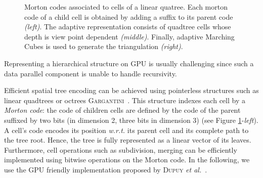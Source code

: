 \documentclass{llncs}
\newcommand{\wrt}{\emph{w.r.t.} }
\begin{document}
\begin{figure}[!htbp]
  \vspace{-0.35cm}
  \begin{center}
  \end{center}
  \vspace{-0.35cm}
\caption{Morton codes associated to cells of a linear quatree. Each
   morton code of a child cell is obtained by adding a suffix to its
  parent code \emph{(left)}. The adaptive representation consists of
  quadtree cells whose depth is view point dependent
  \emph{(middle)}. Finally, adaptive Marching Cubes is used to
  generate the triangulation \emph{(right)}.}
\label{fig_quadtree_partitionning}
\end{figure}

Representing a hierarchical structure on GPU is usually challenging since
such a data parallel component is unable to handle recursivity.


Efficient spatial tree encoding can be
achieved using pointerless structures such as linear quadtrees or octrees
 \textsc{Gargantini}~\cite{gargantini1982effective}. This structure
indexes each cell by a \emph{Morton code}: the code of children
cells are defined by the code of the parent suffixed by two bits (in dimension
2, three bits in dimension 3) (see Figure
\ref{fig_quadtree_partitionning}-\emph{left}). A cell's code encodes its
position \wrt its parent cell and its complete path to the tree root.
Hence, the tree is fully represented as a linear vector of its leaves.
Furthermore, cell operations such as subdivision, merging %
can be efficiently implemented using bitwise operations on the Morton
code. In the following, we use the GPU
friendly
implementation proposed by \textsc{Dupuy}
\textit{et al.}~\cite{dupuy2014quadtrees}.%
\end{document}
